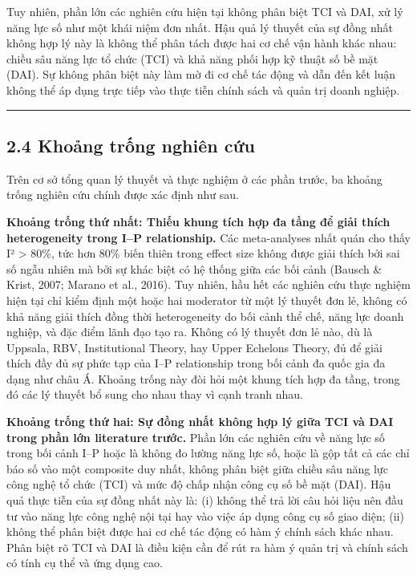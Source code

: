 \documentclass[12pt,a4paper]{article}
\begin{document}
Tuy nhiên, phần lớn các nghiên cứu hiện tại không phân biệt TCI và DAI,
xử lý năng lực số như một khái niệm đơn nhất. Hậu quả lý thuyết của sự
đồng nhất không hợp lý này là không thể phân tách được hai cơ chế vận
hành khác nhau: chiều sâu năng lực tổ chức (TCI) và khả năng phối hợp kỹ
thuật số bề mặt (DAI). Sự không phân biệt này làm mờ đi cơ chế tác động
và dẫn đến kết luận không thể áp dụng trực tiếp vào thực tiễn chính sách
và quản trị doanh nghiệp.

\begin{center}\rule{0.5\linewidth}{0.5pt}\end{center}

\hypertarget{24-khoux1ea3ng-trux1ed1ng-nghiuxean-cux1ee9u}{%
\subsection{2.4 Khoảng trống nghiên
cứu}\label{24-khoux1ea3ng-trux1ed1ng-nghiuxean-cux1ee9u}}

Trên cơ sở tổng quan lý thuyết và thực nghiệm ở các phần trước, ba
khoảng trống nghiên cứu chính được xác định như sau.

\textbf{Khoảng trống thứ nhất: Thiếu khung tích hợp đa tầng để giải
thích heterogeneity trong I--P relationship.} Các meta-analyses nhất
quán cho thấy I² \textgreater{} 80\%, tức hơn 80\% biến thiên trong
effect size không được giải thích bởi sai số ngẫu nhiên mà bởi sự khác
biệt có hệ thống giữa các bối cảnh (Bausch \& Krist, 2007; Marano et
al., 2016). Tuy nhiên, hầu hết các nghiên cứu thực nghiệm hiện tại chỉ
kiểm định một hoặc hai moderator từ một lý thuyết đơn lẻ, không có khả
năng giải thích đồng thời heterogeneity do bối cảnh thể chế, năng lực
doanh nghiệp, và đặc điểm lãnh đạo tạo ra. Không có lý thuyết đơn lẻ
nào, dù là Uppsala, RBV, Institutional Theory, hay Upper Echelons
Theory, đủ để giải thích đầy đủ sự phức tạp của I--P relationship trong
bối cảnh đa quốc gia đa dạng như châu Á. Khoảng trống này đòi hỏi một
khung tích hợp đa tầng, trong đó các lý thuyết bổ sung cho nhau thay vì
cạnh tranh nhau.

\textbf{Khoảng trống thứ hai: Sự đồng nhất không hợp lý giữa TCI và DAI
trong phần lớn literature trước.} Phần lớn các nghiên cứu về năng lực số
trong bối cảnh I--P hoặc là không đo lường năng lực số, hoặc là gộp tất
cả các chỉ báo số vào một composite duy nhất, không phân biệt giữa chiều
sâu năng lực công nghệ tổ chức (TCI) và mức độ chấp nhận công cụ số bề
mặt (DAI). Hậu quả thực tiễn của sự đồng nhất này là: (i) không thể trả
lời câu hỏi liệu nên đầu tư vào năng lực công nghệ nội tại hay vào việc
áp dụng công cụ số giao diện; (ii) không thể phân biệt được hai cơ chế
tác động có hàm ý chính sách khác nhau. Phân biệt rõ TCI và DAI là điều
kiện cần để rút ra hàm ý quản trị và chính sách có tính cụ thể và ứng
dụng cao.
\end{document}
